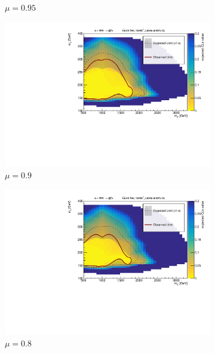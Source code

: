 \begin{figure}[h]
\begin{subfigure}{0.48\textwidth}
    \caption{\(\mu=0.95\)}\label{fig:unblinded_0.95}
  \end{subfigure} \vspace{1em}
  \begin{subfigure}{0.48\textwidth}
    \includegraphics[width=\textwidth]{Figures/App_signal_strength/unblinded_mu0_9_nosig.pdf}
    \caption{\(\mu=0.9\)}\label{fig:unblinded_0.9}
  \end{subfigure} \hspace{0.3em}
  \begin{subfigure}{0.48\textwidth}
    \includegraphics[width=\textwidth]{Figures/App_signal_strength/unblinded_mu0_8_nosig.pdf}
    \caption{\(\mu=0.8\)}\label{fig:unblinded_0.8}
  \end{subfigure} \vspace{1em}  
  \begin{subfigure}{0.48\textwidth}

\end{subfigure}
\end{figure}
